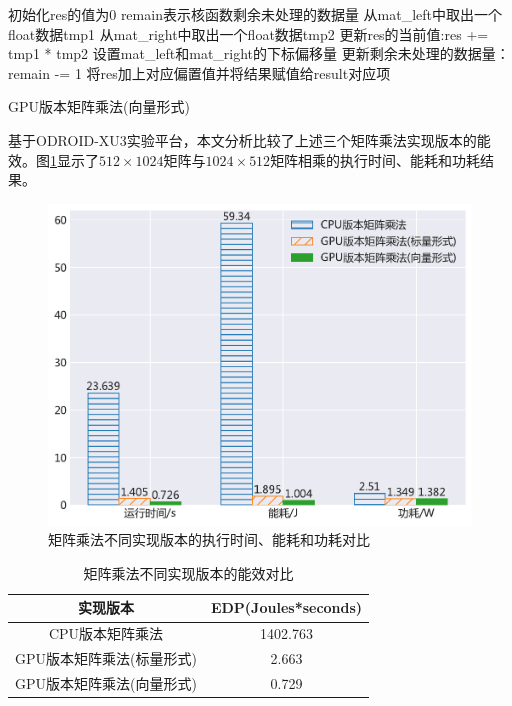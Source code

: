 \begin{algorithm}[htbp]
	\small
	\SetAlgoLined
    \begin{spacing}{0.9}
    初始化res的值为0\;
    remain表示核函数剩余未处理的数据量\;
     {
        从mat\_left中取出一个float数据tmp1\;
        从mat\_right中取出一个float数据tmp2\;
        更新res的当前值:res += tmp1 * tmp2\;
        设置mat\_left和mat\_right的下标偏移量\;
        更新剩余未处理的数据量：remain -= 1\;
    }
    将res加上对应偏置值并将结果赋值给result对应项\;
    \end{spacing}
	\caption{GPU版本矩阵乘法(向量形式)}
	\label{algo:algorithm3}
\end{algorithm}

基于ODROID-XU3实验平台，本文分析比较了上述三个矩阵乘法实现版本的能效。图\ref{figure:figure9}显示了$512\times1024$矩阵与$1024\times512$矩阵相乘的执行时间、能耗和功耗结果。

\begin{figure}[htbp]
    \begin{center}
    \includegraphics[height=0.4\textwidth]{figures/matmul.pdf}
    \end{center}
    \caption{矩阵乘法不同实现版本的执行时间、能耗和功耗对比}\label{figure:figure9}
\end{figure}

\begin{table}[htbp]
  \centering
  \caption{矩阵乘法不同实现版本的能效对比}
  \label{table:table1}
  \begin{tabular}{cc}
    \toprule
      实现版本 & EDP(Joules*seconds) \\
    \midrule
      CPU版本矩阵乘法 & 1402.763 \\
      GPU版本矩阵乘法(标量形式) & 2.663 \\
      GPU版本矩阵乘法(向量形式) & 0.729 \\
    \bottomrule
  \end{tabular}
\end{table}

